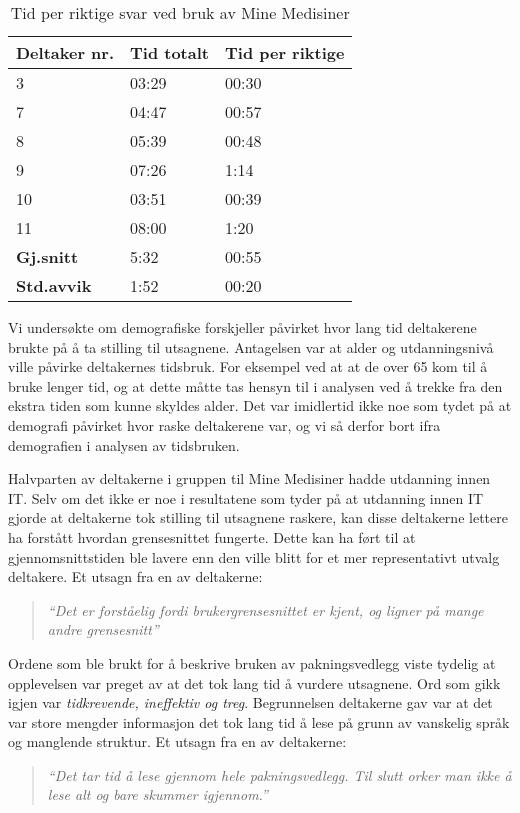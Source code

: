 \begin{table}[H]
    \centering
    \begin{tabular}{ | p{2cm} | p{3cm} |   p{3cm} | }
      \hline
       \textbf{Deltaker nr.} & \textbf{Tid totalt} & \textbf{Tid per riktige} \\ \hline
        3 & 03:29 & 00:30\\ \hline
        7 & 04:47 & 00:57\\ \hline
        8 & 05:39 & 00:48\\ \hline
        9 &  07:26 & 1:14\\ \hline
        10 & 03:51 & 00:39\\ \hline
        11 & 08:00 & 1:20\\ \hline \hline
        \textbf{Gj.snitt} & 5:32 & 00:55 \\ \hline
        \textbf{Std.avvik} & 1:52 & 00:20  \\ \hline
    \end{tabular}
    \caption{Tid per riktige svar ved bruk av Mine Medisiner}
    \label{tab:tidperrettMed}
\end{table}

Vi undersøkte om demografiske forskjeller påvirket hvor lang tid deltakerene brukte på å ta stilling til utsagnene. Antagelsen var at alder og utdanningsnivå ville påvirke deltakernes tidsbruk. For eksempel ved at at de over 65 kom til å bruke lenger tid, og at dette måtte tas hensyn til i analysen ved å trekke fra den ekstra tiden som kunne skyldes alder. Det var imidlertid ikke noe som tydet på at demografi påvirket hvor raske deltakerene var, og vi så derfor bort ifra demografien i analysen av tidsbruken.

Halvparten av deltakerne i gruppen til Mine Medisiner hadde utdanning innen IT. Selv om det ikke er noe i resultatene som tyder på at utdanning innen IT gjorde at deltakerne tok stilling til utsagnene raskere, kan disse deltakerne lettere ha forstått hvordan grensesnittet fungerte. Dette kan ha ført til at gjennomsnittstiden ble lavere enn den ville blitt for et mer representativt utvalg deltakere. Et utsagn fra en av deltakerne: \begin{quote} \textit{ “Det er forståelig fordi brukergrensesnittet er kjent, og ligner på mange andre grensesnitt'' } \end{quote}

Ordene som ble brukt for å beskrive bruken av pakningsvedlegg viste tydelig at opplevelsen var preget av at det tok lang tid å vurdere utsagnene. Ord som gikk igjen var \textit{tidkrevende, ineffektiv og treg}. Begrunnelsen deltakerne gav var at det var store mengder informasjon det tok lang tid å lese på grunn av vanskelig språk og manglende struktur. Et utsagn fra en av deltakerne: \begin{quote} \textit{ “Det tar tid å lese gjennom hele pakningsvedlegg. Til slutt orker man ikke å lese alt og bare skummer igjennom.'' } \end{quote}

